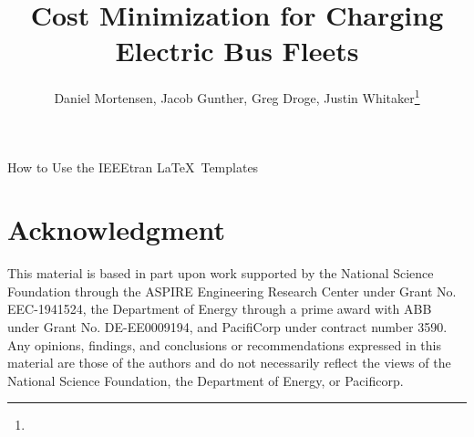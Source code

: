 \documentclass[lettersize,journal]{IEEEtran}
\begin{document}
\title{Cost Minimization for Charging Electric Bus Fleets}
\author{Daniel Mortensen, Jacob Gunther, Greg Droge, Justin Whitaker\thanks{}}

%
{How to Use the IEEEtran \LaTeX \ Templates}

\maketitle 









\section*{Acknowledgment}This material is based in part upon work supported by the National Science Foundation through the ASPIRE Engineering Research Center under Grant No. EEC-1941524, the Department of Energy through a prime award with ABB under Grant No. DE-EE0009194, and PacifiCorp under contract number 3590. Any opinions, findings, and conclusions or recommendations expressed in this material are those of the authors and do not necessarily reflect the views of the National Science Foundation, the Department of Energy, or Pacificorp.
\newpage
\printbibliography
\end{document}
